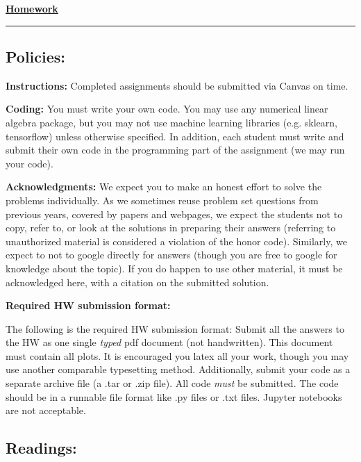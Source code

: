 \documentclass[12pt]{article}
\begin{document}
\courseheader

\begin{center}
  \underline{\bf Homework \thepsctr} \\
  \theterm
\end{center}



\hrule
\begin{flushleft}
\subsection*{Policies:}



{\bf Instructions:} Completed assignments should be
submitted via Canvas on time.

{\bf Coding: \/}  You must write your own code. You may use any
numerical linear algebra package, but you may not use machine
learning libraries (e.g. sklearn, tensorflow) unless otherwise specified.
In addition, each student must write and submit
their own code in the programming part of the assignment (we may run
your code). 

{\bf Acknowledgments: \/} 
We expect you to make an honest effort to solve the problems
individually.  As we sometimes reuse problem set questions from
previous years, covered by papers and webpages, we expect the students
not to copy, refer to, or look at the solutions in preparing their
answers (referring to unauthorized material is considered a violation
of the honor code). Similarly, we expect to not to google directly for
answers (though you are free to google for knowledge about the
topic). If you do happen to use other material, it must be
acknowledged here, with a citation on the submitted solution.


{\bf Required HW submission format: \/} 

The following is the required HW submission format: Submit all the
answers to the HW as one single \emph{typed} pdf document (not
handwritten). This document must contain all plots.  It is encouraged
you latex all your work, though you may use another comparable
typesetting method. Additionally, submit your code as a separate
archive file (a .tar or .zip file). All code \emph{must} be
submitted. The code should be in a runnable file format like .py files
or .txt files. Jupyter notebooks are not acceptable.

\subsection*{Readings:}


\end{flushleft}
\end{document}

